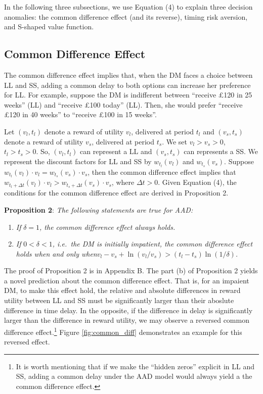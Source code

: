 \documentclass[
  12pt,
]{article}
\begin{document}
In the following three subsections, we use Equation (4) to explain three
decision anomalies: the common difference effect (and its reverse),
timing risk aversion, and S-shaped value function.

\hypertarget{common-difference-effect}{%
\subsection{Common Difference Effect}\label{common-difference-effect}}

The common difference effect \citep{loewenstein1992anomalies} implies
that, when the DM faces a choice between LL and SS, adding a common
delay to both options can increase her preference for LL. For example,
suppose the DM is indifferent between ``receive £120 in 25 weeks'' (LL)
and ``receive £100 today'' (LL). Then, she would prefer ``receive £120
in 40 weeks'' to ``receive £100 in 15 weeks''.

Let \((v_l,t_l)\) denote a reward of utility \(v_l\), delivered at
period \(t_l\) and \((v_s,t_s)\) denote a reward of utility \(v_s\),
delivered at period \(t_s\). We set \(v_l>v_s>0\), \(t_l>t_s>0\). So,
\((v_l,t_l)\) can represent a LL and \((v_s,t_s)\) can represents a SS.
We represent the discount factors for LL and SS by \(w_{t_l}(v_l)\) and
\(w_{t_s}(v_s)\). Suppose
\(w_{t_l}(v_l)\cdot v_l = w_{t_s}(v_s)\cdot v_s\), then the common
difference effect implies that
\(w_{t_l+\Delta t}(v_l)\cdot v_l > w_{t_s+\Delta t}(v_s)\cdot v_s\),
where \(\Delta t >0\). Given Equation (4), the conditions for the common
difference effect are derived in Proposition 2.

\noindent \textbf{Proposition 2}: \emph{The following statements are
true for AAD:}

\begin{enumerate}
\def\labelenumi{(\alph{enumi})}
\item
  \emph{If} \(\delta=1\)\emph{, the common difference effect always
  holds.}
\item
  \emph{If} \(0<\delta<1\)\emph{, i.e.~the DM is initially impatient,
  the common difference effect holds when and only
  when}\(v_l-v_s+\ln(v_l/v_s)>(t_l-t_s)\ln(1/\delta)\)\emph{.}
\end{enumerate}

The proof of Proposition 2 is in Appendix B. The part (b) of Proposition
2 yields a novel prediction about the common difference effect. That is,
for an impaient DM, to make this effect hold, the relative and absolute
differences in reward utility between LL and SS must be significantly
larger than their aboslute difference in time delay. In the opposite, if
the difference in delay is significantly larger than the difference in
reward utility, we may observe a reversed common difference
effect.\footnote{It is worth mentioning that if we make the ``hidden
  zeros'' explicit in LL and SS, adding a common delay under the AAD
  model would always yield a the common difference effect.} Figure
\ref{fig:common_diff} demonstrates an example for this reversed effect.
\end{document}
